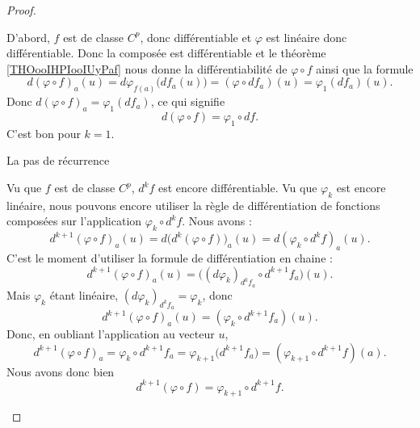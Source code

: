 \begin{proof}
\begin{subproof}
            D'abord, \( f\) est de classe \( C^p\), donc différentiable et \( \varphi\) est linéaire donc différentiable. Donc la composée est différentiable et le théorème \ref{THOooIHPIooIUyPaf} nous donne la différentiabilité de \( \varphi\circ f\) ainsi que la formule
            \begin{equation}
                d(\varphi\circ f)_a(u)=d\varphi_{f(a)}\big( df_a(u) \big)=(\varphi\circ df_a)(u)=\varphi_1(df_a)(u).
            \end{equation}
            Donc \( d(\varphi\circ f)_a=\varphi_1(df_a)\), ce qui signifie 
            \begin{equation}
                d(\varphi\circ f)=\varphi_1\circ df.
            \end{equation}
            C'est bon pour \( k=1\).


        \item[La pas de récurrence]

            Vu que \( f\) est de classe \( C^p\), \( d^kf\) est encore différentiable. Vu que \( \varphi_k\) est encore linéaire, nous pouvons encore utiliser la règle de différentiation de fonctions composées sur l'application \( \varphi_k\circ d^kf\). Nous avons :
            \begin{equation}
                d^{k+1}(\varphi\circ f)_a(u)=d\big( d^k(\varphi\circ f) \big)_a(u)=d(\varphi_k\circ d^kf)_a(u).
            \end{equation}
            C'est le moment d'utiliser la formule de différentiation en chaine :
            \begin{equation}
                d^{k+1}(\varphi\circ f)_a(u)=\big( (d\varphi_k)_{d^kf_a}\circ d^{k+1}f_a \big)(u).
            \end{equation}
            Mais \( \varphi_k\) étant linéaire, \( (d\varphi_k)_{d^kf_a}=\varphi_k\), donc
            \begin{equation}
                d^{k+1}(\varphi\circ f)_a(u)=(\varphi_k\circ d^{k+1}f_a)(u).
            \end{equation}
            Donc, en oubliant l'application au vecteur \( u\),
            \begin{equation}
                d^{k+1}(\varphi\circ f)_a=\varphi_k\circ d^{k+1}f_a=\varphi_{k+1}\big( d^{k+1}f_a \big)=(\varphi_{k+1}\circ d^{k+1}f)(a).
            \end{equation}
            Nous avons donc bien
            \begin{equation}
                d^{k+1}(\varphi\circ f)=\varphi_{k+1}\circ d^{k+1}f.
            \end{equation}
    \end{subproof}
\end{proof}

